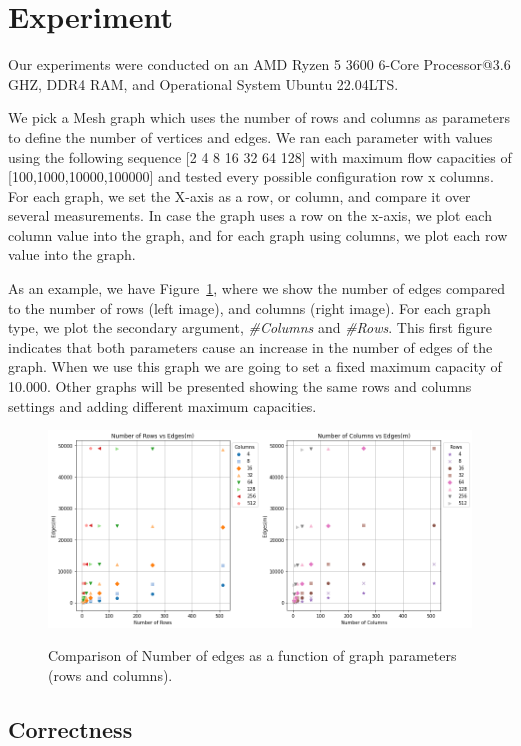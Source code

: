 \documentclass{article}
\begin{document}
\section{Experiment}

Our experiments were conducted on an AMD Ryzen 5 3600 6-Core Processor@3.6 GHZ, DDR4 RAM, and Operational System Ubuntu 22.04LTS.

We pick a Mesh graph which uses the number of rows and columns as parameters to define the number of vertices and edges. We ran each parameter with values using the following sequence [2 4 8 16 32 64 128] with maximum flow capacities of [100,1000,10000,100000] and tested every possible configuration row x columns. For each graph, we set the X-axis as a row, or column, and compare it over several measurements. In case the graph uses a row on the x-axis, we plot each column value into the graph, and for each graph using columns, we plot each row value into the graph.

As an example, we have Figure~\ref{fig:edges-example}, where we show the number of edges compared to the number of rows (left image), and columns (right image). For each graph type, we plot the secondary argument, \emph{\#Columns} and \emph{\#Rows}. This first figure indicates that both parameters cause an increase in the number of edges of the graph. When we use this graph we are going to set a fixed maximum capacity of 10.000. Other graphs will be presented showing the same rows and columns settings and adding different maximum capacities.

\begin{figure}[h]
\centering
  \centering
  \includegraphics[width=0.8\linewidth]{edges.png}
  \label{fig:edges-example}
  \caption{Comparison of Number of edges as a function of graph parameters (rows and columns).}
\end{figure}

\subsection{Correctness}
\end{document}
